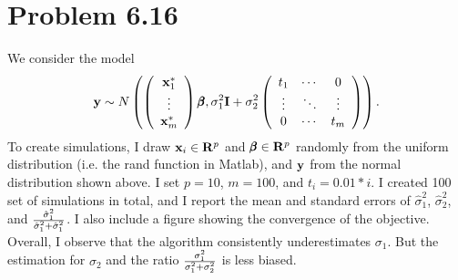 \documentclass{scrartcl}
\begin{document}
\section*{Problem 6.16}

We consider the model
\begin{equation}
\mathbf{y} \sim N\left(\left( \begin{array}{c}
                            \mathbf{x}_1^* \\
                            \vdots \\
                            \mathbf{x}_m^*
                          \end{array}
                   \right) \pmb{\beta},
                   \sigma_1^2 \mathbf{I} + \sigma_2^2
                   \left(
                   \begin{array}{ccc}
                       t_1    & \cdots & 0 \\
                       \vdots & \ddots & \vdots \\
                       0      & \cdots & t_m
                   \end{array}
                   \right)                    
                  \right).
\end{equation}
To create simulations, I draw $\mathbf{x}_i \in \mathbf{R}^p$ and $\pmb{\beta} \in \mathbf{R}^p$ randomly from the uniform distribution (i.e. the rand function in Matlab),
and $\mathbf{y}$ from the normal distribution shown above. I set $p=10$, $m=100$, and $t_i = 0.01*i$. I created 100 set of simulations in total, and I report the
mean and standard errors of $\hat{\sigma}_1^2$, $\hat{\sigma}_2^2$, and $\hat{\sigma}_1^2 \over {\hat{\sigma}_1^2+\hat{\sigma}_1^2}$. I also include a figure
showing the convergence of the objective. Overall, I observe that the algorithm consistently underestimates $\sigma_1$. But the estimation for $\sigma_2$ and
the ratio $\sigma_1^2 \over {\sigma_1^2+\sigma_2^2}$ is less biased.
\end{document}
